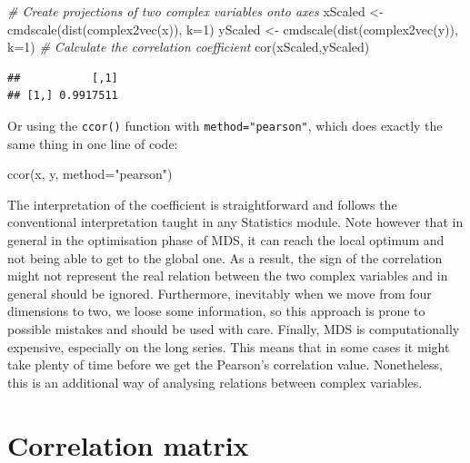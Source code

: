 \documentclass[
]{book}
\newenvironment{Shaded}{\begin{snugshade}}{\end{snugshade}}
\newcommand{\AttributeTok}[1]{\textcolor[rgb]{0.77,0.63,0.00}{#1}}
\newcommand{\CommentTok}[1]{\textcolor[rgb]{0.56,0.35,0.01}{\textit{#1}}}
\newcommand{\DecValTok}[1]{\textcolor[rgb]{0.00,0.00,0.81}{#1}}
\newcommand{\FunctionTok}[1]{\textcolor[rgb]{0.00,0.00,0.00}{#1}}
\newcommand{\NormalTok}[1]{#1}
\newcommand{\OtherTok}[1]{\textcolor[rgb]{0.56,0.35,0.01}{#1}}
\newcommand{\StringTok}[1]{\textcolor[rgb]{0.31,0.60,0.02}{#1}}
\begin{document}
\begin{Shaded}
\begin{Highlighting}[]
\CommentTok{\# Create projections of two complex variables onto axes}
\NormalTok{xScaled }\OtherTok{\textless{}{-}} \FunctionTok{cmdscale}\NormalTok{(}\FunctionTok{dist}\NormalTok{(}\FunctionTok{complex2vec}\NormalTok{(x)), }\AttributeTok{k=}\DecValTok{1}\NormalTok{)}
\NormalTok{yScaled }\OtherTok{\textless{}{-}} \FunctionTok{cmdscale}\NormalTok{(}\FunctionTok{dist}\NormalTok{(}\FunctionTok{complex2vec}\NormalTok{(y)), }\AttributeTok{k=}\DecValTok{1}\NormalTok{)}
\CommentTok{\# Calculate the correlation coefficient}
\FunctionTok{cor}\NormalTok{(xScaled,yScaled)}
\end{Highlighting}
\end{Shaded}

\begin{verbatim}
##           [,1]
## [1,] 0.9917511
\end{verbatim}

Or using the \texttt{ccor()} function with \texttt{method="pearson"}, which does exactly the same thing in one line of code:

\begin{Shaded}
\begin{Highlighting}[]
\FunctionTok{ccor}\NormalTok{(x, y, }\AttributeTok{method=}\StringTok{"pearson"}\NormalTok{)}
\end{Highlighting}
\end{Shaded}

The interpretation of the coefficient is straightforward and follows the conventional interpretation taught in any Statistics module. Note however that in general in the optimisation phase of MDS, it can reach the local optimum and not being able to get to the global one. As a result, the sign of the correlation might not represent the real relation between the two complex variables and in general should be ignored. Furthermore, inevitably when we move from four dimensions to two, we loose some information, so this approach is prone to possible mistakes and should be used with care. Finally, MDS is computationally expensive, especially on the long series. This means that in some cases it might take plenty of time before we get the Pearson's correlation value. Nonetheless, this is an additional way of analysing relations between complex variables.

\hypertarget{correlation-matrix}{%
\section{Correlation matrix}\label{correlation-matrix}}
\end{document}
